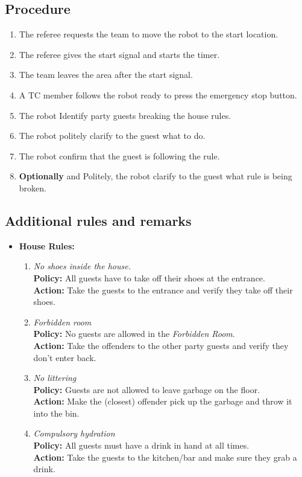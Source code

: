 \subsection*{Procedure}
	\begin{enumerate}[nosep]
		\item The referee requests the team to move the robot to the start location.
		\item The referee gives the start signal and starts the timer.
		\item The team leaves the area after the start signal.		
		\item A TC member follows the robot ready to press the emergency stop button.
		\item The robot Identify party guests breaking the house rules.
		\item The robot politely clarify to the guest what to do. 
		\item The robot confirm that the guest is following the rule.	
		\item \textbf{Optionally} and Politely, the robot clarify to the guest what rule is being broken.
	\end{enumerate}


\subsection*{Additional rules and remarks}
\begin{itemize}[nosep]
	\item \textbf{House Rules:}
	\begin{enumerate}[nosep]
		\item \textit{No shoes inside the house.}\\
		\textbf{Policy:} All guests have to take off their shoes at the entrance.\\
		\textbf{Action:} Take the guests to the entrance and verify they take off their shoes.
	
		\item \textit{Forbidden room}\\
		\textbf{Policy:} No guests are allowed in the \emph{Forbidden Room}. \\
		\textbf{Action:} Take the offenders to the other party guests and verify they don't enter back.
	
		\item \textit{No littering}\\
		\textbf{Policy:} Guests are not allowed to leave garbage on the floor.\\
		\textbf{Action:} Make the (closest) offender pick up the garbage and throw it into the bin.
	
		\item \textit{Compulsory hydration}\\
		\textbf{Policy:} All guests must have a drink in hand at all times.\\
		\textbf{Action:} Take the guests to the kitchen/bar and make sure they grab a drink.
	\end{enumerate}
\end{itemize}

